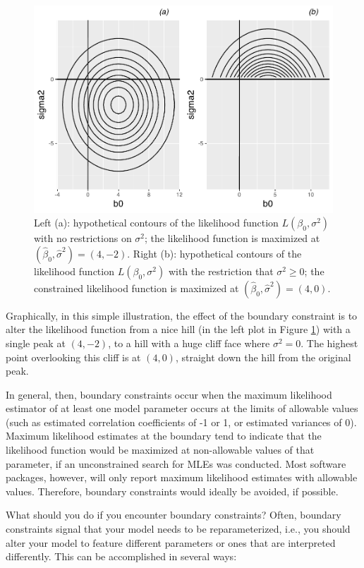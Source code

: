 \documentclass[
]{krantz}
\begin{document}
\begin{figure}

{\centering \includegraphics[width=0.6\linewidth]{bookdown-BeyondMLR_files/figure-latex/boundary-1} 

}

\caption{Left (a): hypothetical contours of the likelihood function \(L(\beta_0, \sigma^2)\) with no restrictions on \(\sigma^2\); the likelihood function is maximized at \((\hat{\beta}_0, \hat{\sigma}^2)=(4,-2)\). Right (b): hypothetical contours of the likelihood function \(L(\beta_0, \sigma^2)\) with the restriction that \(\sigma^2 \geq 0\); the constrained likelihood function is maximized at \((\hat{\beta}_0, \hat{\sigma}^2)=(4,0)\).}\label{fig:boundary}
\end{figure}

Graphically, in this simple illustration, the effect of the boundary constraint is to alter the likelihood function from a nice hill (in the left plot in Figure \ref{fig:boundary}) with a single peak at \((4,-2)\), to a hill with a huge cliff face where \(\sigma^2=0\). The highest point overlooking this cliff is at \((4,0)\), straight down the hill from the original peak.

In general, then, boundary constraints occur when the maximum likelihood estimator of at least one model parameter occurs at the limits of allowable values (such as estimated correlation coefficients of -1 or 1, or estimated variances of 0). Maximum likelihood estimates at the boundary tend to indicate that the likelihood function would be maximized at non-allowable values of that parameter, if an unconstrained search for MLEs was conducted. Most software packages, however, will only report maximum likelihood estimates with allowable values. Therefore, boundary constraints would ideally be avoided, if possible.

What should you do if you encounter boundary constraints? Often, boundary constraints signal that your model needs to be reparameterized, i.e., you should alter your model to feature different parameters or ones that are interpreted differently. This can be accomplished in several ways:
\end{document}
